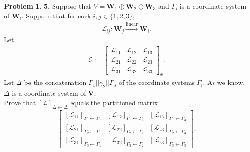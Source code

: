 \documentclass{article}
\theoremstyle{definition}
\newtheorem*{prob*}{Problem}
\newcommand{\V}{\mathbf{V}}
\newcommand{\W}{\mathbf{W}}
\newcommand{\lag}{\mathcal{L}}
\begin{document}
\begin{prob*}\textbf{5.} Suppose that $V = \W_1 \oplus \W_2 \oplus \W_3$ and $\Gamma_i$ is a coordinate system of $\W_i$. Suppose that for each $i,j \in \{1,2,3 \}$, 
	\begin{align*}
	\lag_{ij} : \W_j \overset{\text{linear}}{\longrightarrow} \W_i.
	\end{align*}
	Let 
	\begin{align*}
	\lag := \begin{bmatrix}
	\lag_{11} & \lag_{12} & \lag_{13}\\
	\lag_{21} & \lag_{22} & \lag_{23}\\
	\lag_{31} & \lag_{32} & \lag_{33}
	\end{bmatrix}_\oplus.
	\end{align*}
	Let $\Delta$ be the concatenation $\Gamma_1 \vert\vert \gamma_2\vert\vert \Gamma_3$ of the coordinate systems $\Gamma_i$. As we know, $\Delta$ is a coordinate system of $\V$. \\
	
	Prove that $[\lag]_{\Delta \leftarrow \Delta}$ equals the partitioned matrix
	\begin{align*}
	\begin{bmatrix}
	[\lag_{11}]_{\Gamma_1 \leftarrow \Gamma_1} & [\lag_{12}]_{\Gamma_1 \leftarrow \Gamma_2} & [\lag_{13}]_{\Gamma_1 \leftarrow \Gamma_3}\\
	[\lag_{21}]_{\Gamma_2 \leftarrow \Gamma_1} & [\lag_{22}]_{\Gamma_2 \leftarrow \Gamma_2} & [\lag_{23}]_{\Gamma_2 \leftarrow \Gamma_3}\\
	[\lag_{31}]_{\Gamma_3 \leftarrow \Gamma_1} & [\lag_{32}]_{\Gamma_3 \leftarrow \Gamma_2} & [\lag_{33}]_{\Gamma_3 \leftarrow \Gamma_3}
	\end{bmatrix}.
	\end{align*}
	 
	
	
	
\end{prob*}








































\newpage
\end{document}
